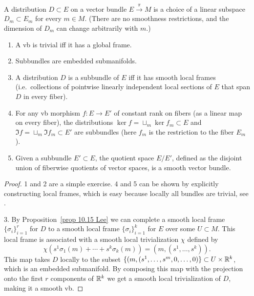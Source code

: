\begin{defn}[Distribution]
    A distribution $D\subset E$ on a vector bundle $E\overset{\pi}{\to}M$ is a choice of a linear subspace $D_m\subset E_m$ for every $m\in M$. (There are no smoothness restrictions, and the dimension of $D_m$ can change arbitrarily with $m$.)
\end{defn}
\begin{thm}\label{subbundles thm}
\begin{enumerate}
    \item A \gls{vb} is trivial iff it has a global frame.
    \item Subbundles are embedded submanifolds.
    \item A distribution $D$ is a subbundle of $E$ iff it has smooth local frames (i.e.\ collections of pointwise linearly independent local sections of $E$ that span $D$ in every fiber).
    \item For any \gls{vb} morphism $f:E\to E'$ of constant rank on fibers (as a linear map on every fiber), the distributions $\ker f=\sqcup_m \ker f_m\subset E$ and $\Im f=\sqcup_m \Im f_m\subset E'$ are subbundles (here $f_m$ is the restriction to the fiber $E_m$).
    \item Given a subbundle $E'\subset E$,  the quotient space $E/E'$, defined as the disjoint union of fiberwise quotients of vector spaces, is a smooth vector bundle.
\end{enumerate}
\end{thm}
\begin{proof}
    1 and 2 are a simple exercise. 4 and 5 can be shown by explicitly constructing local frames, which is easy because locally all bundles are trivial, see \cite[Thm.~10.34]{Lee}.

    3. By Proposition~\ref{prop 10.15 Lee} we can complete a smooth local frame $\{\sigma_i\}_{i=1}^r$ for $D$ to a smooth local frame $\{\sigma_i\}_{i=1}^k$ for $E$ over some $U\subset M$. This local frame is associated with a smooth local trivialization $\chi$ defined by 
    \[\chi(s^1\sigma_1(m)+\cdots+s^k\sigma_k(m))=(m,(s^1,\ldots,s^k)).\]
    This map takes $D$ locally to the subset $\{(m,(s^1,\ldots,s^m,0,\ldots,0)\}\subset U\times \mathbb{R}^k$, which is an embedded submanifold. By composing this map with the projection onto the first $r$ components of $\mathbb{R}^k$ we get a smooth local trivialization of $D$, making it a smooth \gls{vb}.
\end{proof}



